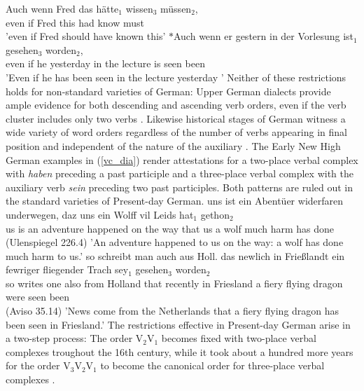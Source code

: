 \documentclass[output=paper]{langsci/langscibook}
\begin{document}
\eal
\ex \label{noncanon}
\gll Auch wenn Fred das hätte$_1$ wissen$_3$ müssen$_2$, \\ even if Fred this had know must \\
\glt 'even if Fred should have known this’
\ex \label{noncanon_wrong}
\gll $*$Auch wenn er gestern in der Vorlesung ist$_1$ gesehen$_3$ worden$_2$, \\ even if he yesterday in the lecture is seen been   \\
\glt 'Even if he has been seen in the lecture yesterday '
\zl
Neither of these restrictions holds for non-standard varieties of German: Upper German dialects provide ample evidence for both descending and ascending verb orders, even if the verb cluster includes only two verbs \citep{dubenion2010}. Likewise historical stages of German witness a wide variety of word orders regardless of the number of verbs appearing in final position and independent of the nature of the auxiliary \citep{ebert1981,haerd1981,sapp2011}. The Early New High German examples in (\ref{vc_dia}) render attestations for a two-place verbal complex with \textit{haben} preceding a past participle and a three-place verbal complex with the auxiliary verb \textit{sein} preceding two past participles. Both patterns are ruled out in the standard varieties of Present-day German.
\eal \label{vc_dia}
\ex
\gll uns ist ein Abentüer widerfaren underwegen, daz uns ein Wolff vil Leids hat$_1$ gethon$_2$ \\ us is an adventure happened {on the way} that us a wolf much harm has done  \\  \hfill (Ulenspiegel 226.4)
\glt 'An adventure happened to us on the way: a wolf has done much harm to us.'
\ex
\gll so schreibt man auch aus Holl. das newlich in Frießlandt ein fewriger fliegender Trach sey$_1$ gesehen$_3$ worden$_2$ \\ so writes one also from Holland that recently in Friesland a fiery flying dragon were seen been \\  \hfill (Aviso 35.14)
\glt 'News come from the Netherlands that a fiery flying dragon has been seen in Friesland.'
\zl
The restrictions effective in Present-day German arise in a two-step process: The order V$_2$V$_1$ becomes fixed with two-place verbal complexes troughout the 16th century, while it took about a hundred more years for the order V$_3$V$_2$V$_1$ to become the canonical order for three-place verbal complexes \citep{ebert1981,haerd1981,sapp2011}.
\end{document}
